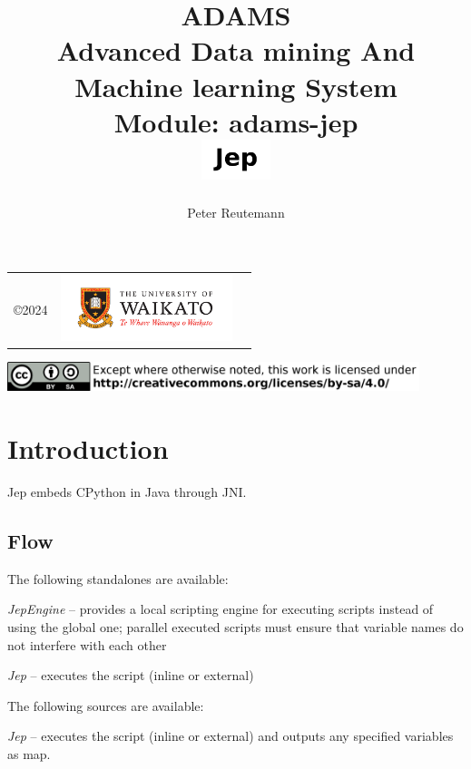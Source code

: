 \documentclass[a4paper]{book}
\title{
  \textbf{ADAMS} \\
  {\Large \textbf{A}dvanced \textbf{D}ata mining \textbf{A}nd \textbf{M}achine
  learning \textbf{S}ystem} \\
  {\Large Module: adams-jep} \\
  \vspace{1cm}
  \includegraphics[width=2cm]{images/jep-module.png} \\
}
\author{
  Peter Reutemann
}
\begin{document}
\begin{titlepage}
\maketitle

\thispagestyle{empty}
\center
\begin{table}[b]
	\begin{tabular}{c l l}
		\parbox[c][2cm]{2cm}{\copyright 2024} &
		\parbox[c][2cm]{5cm}{\includegraphics[width=5cm]{images/coat_of_arms.pdf}} \\
	\end{tabular}
	\includegraphics[width=12cm]{images/cc.png} \\
\end{table}

\end{titlepage}

\tableofcontents


\chapter{Introduction}
Jep embeds CPython in Java through JNI\cite{jep}.

\section{Flow}
The following standalones are available:
\begin{tight_itemize}
	\item \textit{JepEngine} -- provides a local scripting engine for executing
	scripts instead of using the global one; parallel executed scripts must ensure
	that variable names do not interfere with each other
	\item \textit{Jep} -- executes the script (inline or external)
\end{tight_itemize}
The following sources are available:
\begin{tight_itemize}
	\item \textit{Jep} -- executes the script (inline or external) and outputs any specified variables as map.
\end{tight_itemize}


\end{document}
